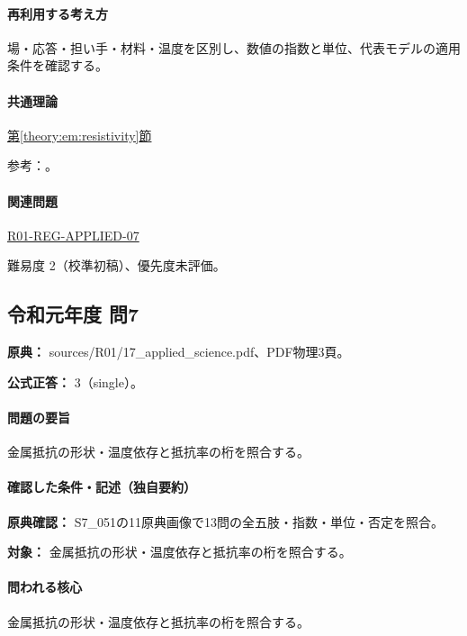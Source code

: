 \paragraph{再利用する考え方} 場・応答・担い手・材料・温度を区別し、数値の指数と単位、代表モデルの適用条件を確認する。

\paragraph{共通理論} \hyperref[theory:em:resistivity]{第\ref*{theory:em:resistivity}節}

\par 参考：\cite{openstax_resistivity,em51_resistance}。

\paragraph{関連問題} \hyperref[q:r01-reg-applied-07]{R01-REG-APPLIED-07}

\par 難易度 2（校準初稿）、優先度未評価。

\subsection{令和元年度 問7}
\label{q:r01-reg-applied-07}

\noindent\textbf{原典：} sources/R01/17\_applied\_science.pdf、PDF物理3頁。

\textbf{公式正答：} 3（single）。

\paragraph{問題の要旨} 金属抵抗の形状・温度依存と抵抗率の桁を照合する。

\paragraph{確認した条件・記述（独自要約）}\mbox{}\par

\noindent\textbf{原典確認：} S7\_051の11原典画像で13問の全五肢・指数・単位・否定を照合。\par

\noindent\textbf{対象：} 金属抵抗の形状・温度依存と抵抗率の桁を照合する。\par

\paragraph{問われる核心} 金属抵抗の形状・温度依存と抵抗率の桁を照合する。

